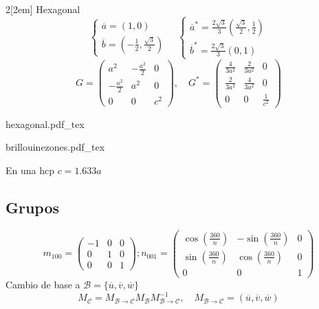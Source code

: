 \documentclass[leqno]{article}
\newcommand{\incfig}[1]{%
\begin{center}
\def\svgwidth{0.9\columnwidth}
{#1.pdf_tex}
\end{center}
}
\begin{document}
\begin{multicols}{2}[\columnsep2em]
Hexagonal
\[
\begin{cases}
  \overline{a} = (1, 0)\\
  \overline{b} = (-\frac{1}{2}, \frac{\sqrt{3} }{2})
\end{cases} \quad
\begin{cases}
  \overline{a}^* = \frac{2 \sqrt{3} }{3}(\frac{\sqrt{3} }{2}, \frac{1}{2}) \\
  \overline{b}^* = \frac{2 \sqrt{3} }{3}( 0, 1)
\end{cases}
\]
\[
  G = \begin{pmatrix} a^2 & -\frac{a^2}{2} & 0 \\ -\frac{a^2}{2} & a^2 & 0 \\ 0 & 0 & c^2\end{pmatrix} , \quad
  G^* = \begin{pmatrix} \frac{4}{3a^2} & \frac{2}{3a^2} & 0 \\ \frac{2}{3a^2} & \frac{4}{3a^2} & 0 \\ 0 & 0 & \frac{1}{c^2}\end{pmatrix} 
\] 
\begin{minipage}{0.7\columnwidth}
  \incfig{hexagonal}
\end{minipage}
\begin{minipage}{0.3\columnwidth}
  \incfig{brillouinezones}
\end{minipage}

En una hcp $c = 1.633a$

\subsection{Grupos}
\[
  m_{100} = \begin{pmatrix} -1&0&0\\0&1&0\\0&0&1 \end{pmatrix};
  n_{001} = \begin{pmatrix} \cos\left( \frac{360}{n} \right) &-\sin\left( \frac{360}{n} \right) &0\\ \sin\left( \frac{360}{n} \right) &\cos\left( \frac{360}{n} \right) &0\\0&0&1 \end{pmatrix}
\] 
Cambio de base a $\mathcal{B}=\{\overline{u}, \overline{v}, \overline{w}\}$
\[
  M_{\mathcal{C}} = M_{\mathcal{B}\to \mathcal{C}} M_{\mathcal{B}} M_{\mathcal{B}\to \mathcal{C}}^{-1}, \quad M_{\mathcal{B}\to \mathcal{C}} = (\overline{u}, \overline{v}, \overline{w})
\] 


\end{multicols}
\end{document}
